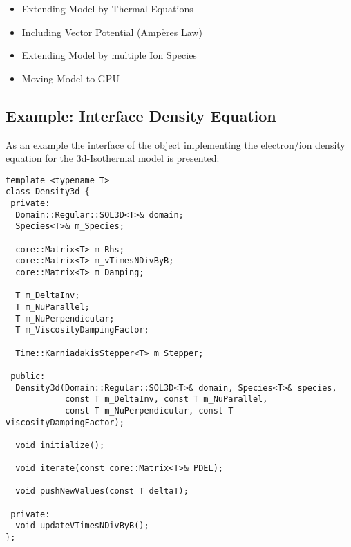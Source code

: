 \documentclass[master.tex]{subfiles}
\begin{document}
\begin{itemize}
  \item Extending Model by Thermal Equations
  \item Including Vector Potential (Ampères Law)
  \item Extending Model by multiple Ion Species
  \item Moving Model to GPU
\end{itemize}

\subsection{Example: Interface Density Equation}
As an example the interface of the object implementing the electron/ion density equation for the 3d-Isothermal model is presented:

\begin{lstlisting}
template <typename T>
class Density3d {
 private:
  Domain::Regular::SOL3D<T>& domain;
  Species<T>& m_Species;

  core::Matrix<T> m_Rhs;
  core::Matrix<T> m_vTimesNDivByB;
  core::Matrix<T> m_Damping;

  T m_DeltaInv;
  T m_NuParallel;
  T m_NuPerpendicular;
  T m_ViscosityDampingFactor;

  Time::KarniadakisStepper<T> m_Stepper;

 public:
  Density3d(Domain::Regular::SOL3D<T>& domain, Species<T>& species,
            const T m_DeltaInv, const T m_NuParallel,
            const T m_NuPerpendicular, const T viscosityDampingFactor);

  void initialize();

  void iterate(const core::Matrix<T>& PDEL);

  void pushNewValues(const T deltaT);

 private:
  void updateVTimesNDivByB();
};
\end{lstlisting}
\end{document}
